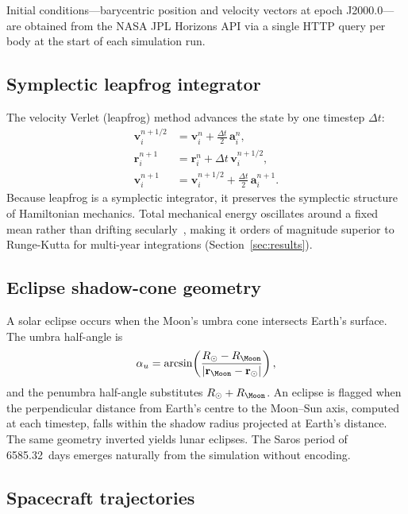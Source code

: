 \documentclass[conference]{IEEEtran}
\begin{document}
Initial conditions---barycentric position and velocity
vectors at epoch J2000.0---are obtained from the
NASA JPL Horizons API \cite{standish1998} via a single
HTTP query per body at the start of each simulation run.

\subsection{Symplectic leapfrog integrator}

The velocity Verlet (leapfrog) method \cite{hairer2006}
advances the state by one timestep $\Delta t$:
\begin{align}
  \mathbf{v}_{i}^{n+1/2} &= \mathbf{v}_{i}^{n}
    + \tfrac{\Delta t}{2}\,\mathbf{a}^n_i, \label{eq:lf1}\\
  \mathbf{r}_{i}^{n+1}   &= \mathbf{r}_{i}^{n}
    + \Delta t\,\mathbf{v}_{i}^{n+1/2},   \label{eq:lf2}\\
  \mathbf{v}_{i}^{n+1}   &= \mathbf{v}_{i}^{n+1/2}
    + \tfrac{\Delta t}{2}\,\mathbf{a}^{n+1}_i. \label{eq:lf3}
\end{align}
Because leapfrog is a symplectic integrator, it preserves
the symplectic structure of Hamiltonian mechanics.  Total
mechanical energy oscillates around a fixed mean rather
than drifting secularly~\cite{wisdom1991}, making it
orders of magnitude superior to Runge-Kutta for
multi-year integrations (Section~\ref{sec:results}).

\subsection{Eclipse shadow-cone geometry}

A solar eclipse occurs when the Moon's umbra cone
intersects Earth's surface.  The umbra half-angle is
\begin{equation}
  \alpha_u = \arcsin\!\left(
    \frac{R_\odot - R_{\Moon}}{|\mathbf{r}_{\Moon} - \mathbf{r}_\odot|}
  \right),
\end{equation}
and the penumbra half-angle substitutes $R_\odot + R_{\Moon}$.
An eclipse is flagged when the perpendicular distance from
Earth's centre to the Moon--Sun axis, computed at each
timestep, falls within the shadow radius projected at
Earth's distance.  The same geometry inverted yields lunar
eclipses.  The Saros period of \SI{6585.32}{days} emerges
naturally from the simulation without encoding.

\subsection{Spacecraft trajectories}
\end{document}
